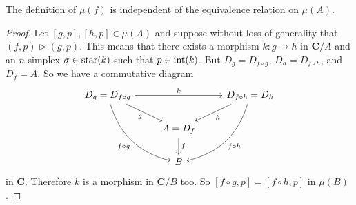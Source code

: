 \begin{lemma}
The definition of $\mu(f)$ is independent of the equivalence relation on $\mu(A)$.
\end{lemma}
\begin{proof}
Let $[g,p], [h,p] \in \mu(A)$ and suppose without loss of generality that $(f,p) \rhd (g,p)$. This means that there exists a morphism $k : g \to h$ in $\mathbf{C}/A$ and an $n$-simplex $\sigma \in \operatorname{star}(k)$ such that $p \in \operatorname{int}(k)$. But $D_g = D_{f \circ g}$, $D_h = D_{f \circ h}$, and $D_f = A$. So we have a commutative diagram
\begin{equation}
\label{eq:morphism in C/A factors in C/B}
\begin{tikzcd}
D_g = D_{f \circ g} \arrow{rr}{k} \arrow[swap]{dr}{g} \arrow[swap, bend right]{ddr}{f \circ g} & & D_{f \circ h} = D_h \arrow{dl}{h} \arrow[bend left]{ddl}{f \circ h} \\
 & A = D_f \arrow{d}{f} \\
 & B &
\end{tikzcd}
\end{equation}
in $\mathbf{C}$. Therefore $k$ is a morphism in $\mathbf{C}/B$ too. So $[f \circ g,p] = [f \circ h,p]$ in $\mu(B)$.
\end{proof}


